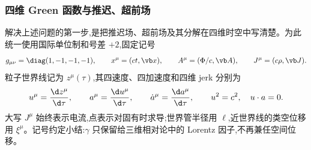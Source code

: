 \subsubsection{四维 Green 函数与推迟、超前场}

解决上述问题的第一步,是把推迟场、超前场及其分解在四维时空中写清楚。为此统一使用国际单位制和号差 $+2$,固定记号
\begin{equation*}
 g_{\mu\nu}=\diag(1,-1,-1,-1),
 \qquad
 x^\mu=(ct,\vb x),
 \qquad
 A^\mu=(\Phi/c,\vb A),
 \qquad
 J^\mu=(c\rho,\vb J).
\end{equation*}
粒子世界线记为 $z^\mu(\tau)$,其四速度、四加速度和四维 jerk 分别为
\begin{equation*}
 u^\mu={\d z^\mu\over\d\tau},
 \qquad
 a^\mu={\d u^\mu\over\d\tau},
 \qquad
 \dot a^\mu={\d a^\mu\over\d\tau},
 \qquad
 u^2=c^2,
 \quad
 u\cdot a=0.
\end{equation*}
大写 $J^\mu$ 始终表示电流,点表示对固有时求导;世界管半径用 $\ell$,近世界线的类空位移用 $\xi^\mu$。记号约定小结:$\gamma$ 只保留给三维相对论中的 Lorentz 因子,不再兼任空间位移。

